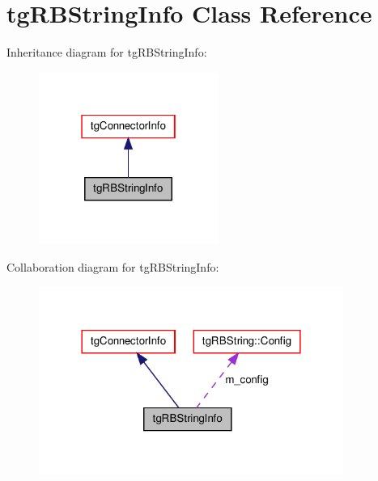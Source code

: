 \hypertarget{classtg_r_b_string_info}{\section{tg\-R\-B\-String\-Info Class Reference}
\label{classtg_r_b_string_info}
}


Inheritance diagram for tg\-R\-B\-String\-Info\-:\nopagebreak
\begin{figure}[H]
\begin{center}
\leavevmode
\includegraphics[width=166pt]{classtg_r_b_string_info__inherit__graph}
\end{center}
\end{figure}


Collaboration diagram for tg\-R\-B\-String\-Info\-:\nopagebreak
\begin{figure}[H]
\begin{center}
\leavevmode
\includegraphics[width=282pt]{classtg_r_b_string_info__coll__graph}
\end{center}
\end{figure}
